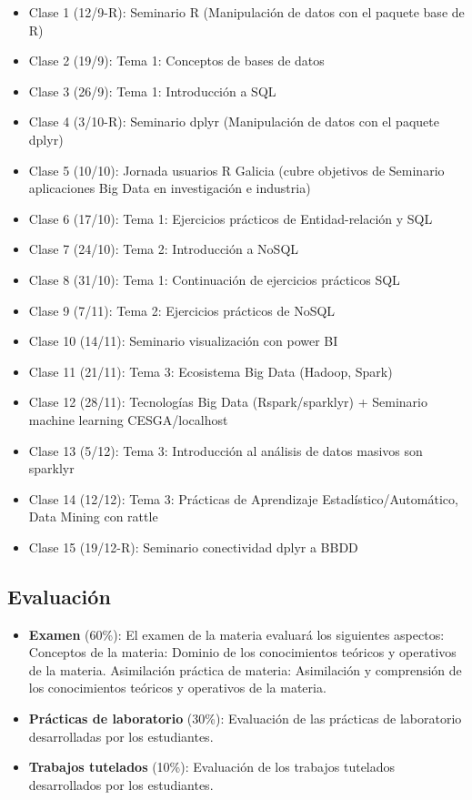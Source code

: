\documentclass[]{book}
\begin{document}
\begin{itemize}
\item
  Clase 1 (12/9-R): Seminario R (Manipulación de datos con el paquete
  base de R)
\item
  Clase 2 (19/9): Tema 1: Conceptos de bases de datos
\item
  Clase 3 (26/9): Tema 1: Introducción a SQL
\item
  Clase 4 (3/10-R): Seminario dplyr (Manipulación de datos con el
  paquete dplyr)
\item
  Clase 5 (10/10): Jornada usuarios R Galicia (cubre objetivos de
  Seminario aplicaciones Big Data en investigación e industria)
\item
  Clase 6 (17/10): Tema 1: Ejercicios prácticos de Entidad-relación y
  SQL
\item
  Clase 7 (24/10): Tema 2: Introducción a NoSQL
\item
  Clase 8 (31/10): Tema 1: Continuación de ejercicios prácticos SQL
\item
  Clase 9 (7/11): Tema 2: Ejercicios prácticos de NoSQL
\item
  Clase 10 (14/11): Seminario visualización con power BI
\item
  Clase 11 (21/11): Tema 3: Ecosistema Big Data (Hadoop, Spark)
\item
  Clase 12 (28/11): Tecnologías Big Data (Rspark/sparklyr) + Seminario
  machine learning CESGA/localhost
\item
  Clase 13 (5/12): Tema 3: Introducción al análisis de datos masivos son
  sparklyr
\item
  Clase 14 (12/12): Tema 3: Prácticas de Aprendizaje
  Estadístico/Automático, Data Mining con rattle
\item
  Clase 15 (19/12-R): Seminario conectividad dplyr a BBDD
\end{itemize}

\subsection{Evaluación}\label{evaluacion}

\begin{itemize}
\item
  \textbf{Examen} (60\%): El examen de la materia evaluará los
  siguientes aspectos: Conceptos de la materia: Dominio de los
  conocimientos teóricos y operativos de la materia. Asimilación
  práctica de materia: Asimilación y comprensión de los conocimientos
  teóricos y operativos de la materia.
\item
  \textbf{Prácticas de laboratorio} (30\%): Evaluación de las prácticas
  de laboratorio desarrolladas por los estudiantes.
\item
  \textbf{Trabajos tutelados} (10\%): Evaluación de los trabajos
  tutelados desarrollados por los estudiantes.
\end{itemize}
\end{document}

